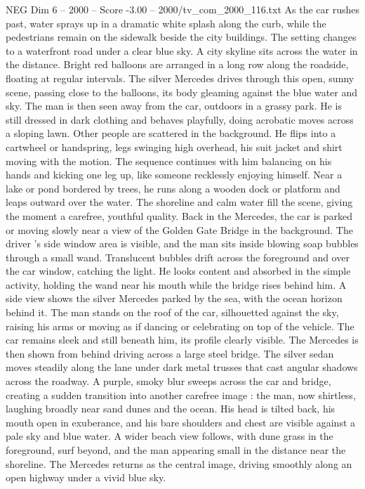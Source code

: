 \begin{textsample}{NEG Dim 6 – 2000 – Score -3.00 – 2000/tv\_com\_2000\_116.txt}
As the car rushes past, water sprays up in a dramatic white splash along the curb, while the pedestrians remain on the sidewalk beside the city buildings.
The setting changes to a waterfront road under a clear blue sky.
A city skyline sits across the water in the distance.
Bright red balloons are arranged in a long row along the roadside, floating at regular intervals.
The silver Mercedes drives through this open, sunny scene, passing close to the balloons, its body gleaming against the blue water and sky.
The man is then seen away from the car, outdoors in a grassy park.
He is still dressed in dark clothing and behaves playfully, doing acrobatic moves across a sloping lawn.
Other people are scattered in the background.
He flips into a cartwheel or handspring, legs swinging high overhead, his suit jacket and shirt moving with the motion.
The sequence continues with him balancing on his hands and kicking one leg up, like someone recklessly enjoying himself.
Near a lake or pond bordered by trees, he runs along a wooden dock or platform and leaps outward over the water.
The shoreline and calm water fill the scene, giving the moment a carefree, youthful quality.
Back in the Mercedes, the car is parked or moving slowly near a view of the Golden Gate Bridge in the background.
The driver ’s side window area is visible, and the man sits inside blowing soap bubbles through a small wand.
Translucent bubbles drift across the foreground and over the car window, catching the light.
He looks content and absorbed in the simple activity, holding the wand near his mouth while the bridge rises behind him.
A side view shows the silver Mercedes parked by the sea, with the ocean horizon behind it.
The man stands on the roof of the car, silhouetted against the sky, raising his arms or moving as if dancing or celebrating on top of the vehicle.
The car remains sleek and still beneath him, its profile clearly visible.
The Mercedes is then shown from behind driving across a large steel bridge.
The silver sedan moves steadily along the lane under dark metal trusses that cast angular shadows across the roadway.
A purple, smoky blur sweeps across the car and bridge, creating a sudden transition into another carefree image : the man, now shirtless, laughing broadly near sand dunes and the ocean.
His head is tilted back, his mouth open in exuberance, and his bare shoulders and chest are visible against a pale sky and blue water.
A wider beach view follows, with dune grass in the foreground, surf beyond, and the man appearing small in the distance near the shoreline.
The Mercedes returns as the central image, driving smoothly along an open highway under a vivid blue sky.

\end{textsample}
